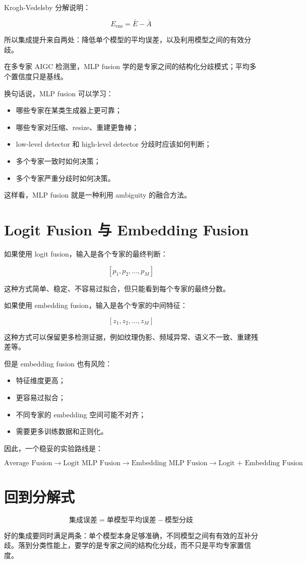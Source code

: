 Krogh-Vedelsby 分解说明：

\[
E_{\text{ens}} = \bar{E} - \bar{A}
\]

所以集成提升来自两处：降低单个模型的平均误差，以及利用模型之间的有效分歧。

在多专家 AIGC 检测里，MLP fusion 学的是专家之间的结构化分歧模式；平均多个置信度只是基线。

换句话说，MLP fusion 可以学习：

\begin{itemize}
  \item 哪些专家在某类生成器上更可靠；
  \item 哪些专家对压缩、resize、重建更鲁棒；
  \item low-level detector 和 high-level detector 分歧时应该如何判断；
  \item 多个专家一致时如何决策；
  \item 多个专家严重分歧时如何决策。
\end{itemize}

这样看，MLP fusion 就是一种利用 ambiguity 的融合方法。

\section{Logit Fusion 与 Embedding Fusion}

如果使用 logit fusion，输入是各个专家的最终判断：

\[
[p_1, p_2, \dots, p_M]
\]

这种方式简单、稳定、不容易过拟合，但只能看到每个专家的最终分数。

如果使用 embedding fusion，输入是各个专家的中间特征：

\[
[z_1, z_2, \dots, z_M]
\]

这种方式可以保留更多检测证据，例如纹理伪影、频域异常、语义不一致、重建残差等。

但是 embedding fusion 也有风险：

\begin{itemize}
  \item 特征维度更高；
  \item 更容易过拟合；
  \item 不同专家的 embedding 空间可能不对齐；
  \item 需要更多训练数据和正则化。
\end{itemize}

因此，一个稳妥的实验路线是：

\[
\text{Average Fusion}
\rightarrow
\text{Logit MLP Fusion}
\rightarrow
\text{Embedding MLP Fusion}
\rightarrow
\text{Logit + Embedding Fusion}
\]

\section{回到分解式}

\[
\text{集成误差} = \text{单模型平均误差} - \text{模型分歧}
\]

好的集成要同时满足两条：单个模型本身足够准确，不同模型之间有有效的互补分歧。落到分类性能上，要学的是专家之间的结构化分歧，而不只是平均专家置信度。
